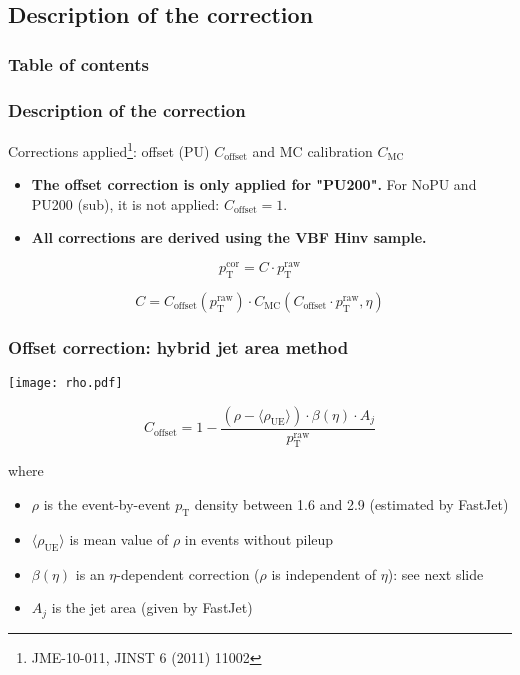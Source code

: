 \documentclass[8pt]{beamer}
\begin{document}
 \subsection{Description of the correction}
 
 \begin{frame}
 \frametitle{Table of contents}
 
\end{frame}
 
 \begin{frame}
  \frametitle{Description of the correction}
  
  \begin{block}{}
   Corrections applied\footnote{JME-10-011, JINST 6 (2011) 11002}: offset (PU) $C_\text{offset}$ and MC calibration $C_\text{MC}$
   
   \begin{itemize}
    \item \textbf{The offset correction is only applied for "PU200".} For NoPU and PU200 (sub), it is not applied: $C_\text{offset} = 1$.
    \item \textbf{All corrections are derived using the VBF Hinv sample.}
   \end{itemize}

  \end{block}

  
  $$p_\text{T}^\text{cor} = C \cdot p_\text{T}^\text{raw}$$
  
  $$C = C_\text{offset} (p_\text{T}^\text{raw}) \cdot C_\text{MC} (C_\text{offset} \cdot p_\text{T}^\text{raw}, \eta)$$
 \end{frame}
 
 \begin{frame}
  \frametitle{Offset correction: hybrid jet area method}
  
  \begin{center}
   \texttt{[image: rho.pdf]}
  \end{center}

  
  $$C_\text{offset} = 1 - \frac{\left(\rho - \langle \rho_\text{UE} \rangle \right) \cdot \beta(\eta) \cdot A_j}{p_\text{T}^\text{raw}}$$
  
  where
  
  \begin{itemize}
   \item $\rho$ is the event-by-event $p_\text{T}$ density between 1.6 and 2.9 (estimated by FastJet)
   \item $\langle \rho_\text{UE} \rangle$ is mean value of $\rho$ in events without pileup
   \item $\beta(\eta)$ is an $\eta$-dependent correction ($\rho$ is independent of $\eta$): see next slide
   \item $A_j$ is the jet area (given by FastJet)
  \end{itemize}

 \end{frame}
 
\end{document}

